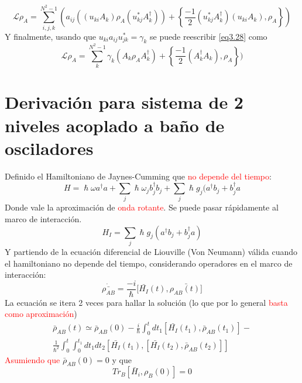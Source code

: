 \documentclass{book}
\begin{document}
\begin{equation}\label{eq3.28}\mathcal{L}\rho_A=\sum_{i,j,k}^{N^2-1}( a_{ij}((u_{ki}A_k)\rho_A(u_{kj}^*A_k^\dag))+\left\{\frac{-1}{2}(u_{kj}^*A_k^\dag) (u_{ki}A_k),\rho_A\right\})\end{equation}
Y finalmente, usando que $u_{ki}a_{ij}u_{jk}^*=\gamma_k$ se puede reescribir \textcolor{blue}{\ref{eq3.28}} como 
\begin{equation}\label{eq3.29}\mathcal{L}\rho_A=\sum_k^{N^2-1}\gamma_k(A_k\rho_A A_k^\dag)+\left\{\frac{-1}{2}(A_k^\dag A_k),\rho_A\right\})\end{equation}
\section{Derivación para sistema de 2 niveles acoplado a baño de osciladores}
Definido el Hamiltoniano de Jaynes-Cumming que \textcolor{Red}{no depende del tiempo}: 
\begin{equation}\label{eq3.30}H=\hslash\omega a^\dag a+\sum_j \hslash \omega_jb_j^\dag b_j+\sum_j \hslash g_j(a^\dag b_j+b_j^\dag a\end{equation}
Donde vale la aproximación de \textcolor{Red}{onda rotante}. Se puede pasar rápidamente al marco de interacción.
\begin{equation}\label{eq3.31}H_I=\sum_j \hslash g_j(a^\dag b_j+b_j^\dag a) \end{equation} Y partiendo de la ecuación diferencial de Liouville (Von Neumann) válida cuando el hamiltoniano no depende del tiempo, considerando operadores en el marco de interacción:
\begin{equation}\label{eq3.32}\dot{\bar{\rho_{AB}}}=\frac{-i}{\hslash}[\bar{H_I}(t),\bar{\rho_{AB}(t)]}\end{equation}
La ecuación se itera 2 veces para hallar la solución (lo que por lo general \textcolor{Red}{basta como aproximación})
\begin{equation}\label{eq3.33} \begin{aligned}\bar{\rho}_{AB}(t)\simeq\bar\rho_{AB}(0)-\frac{i}{\hslash}\int_0^t dt_1[\bar{H_I}(t_1),\bar{\rho}_{AB}(t_1)]- \\ \frac{1}{\hslash^2}\int_0^t\int_0^{t_1}dt_1dt_2[\bar{H_I}(t_1),[\bar{H_I}(t_2),\bar{\rho}_{AB}(t_2)]]\end{aligned}\end{equation}
\textcolor{Red}{Asumiendo que} $\bar{\rho}_{AB}(0)=0$ y que 
\begin{equation}\label{eq3.34}Tr_B[\bar{H}_i,\rho_B(0)]=0\end{equation}
\end{document}
